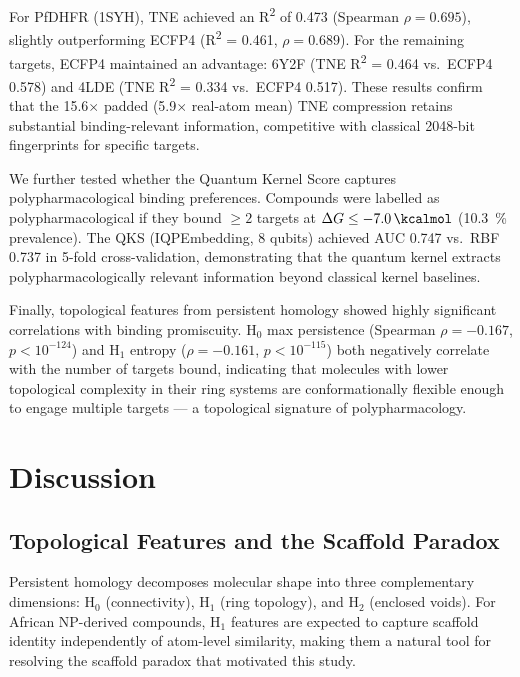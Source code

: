 \documentclass[11pt,a4paper]{article}
\begin{document}
For PfDHFR (1SYH), TNE achieved an R\textsuperscript{2} of \num{0.473} (Spearman $\rho = \num{0.695}$), slightly outperforming ECFP4 (R\textsuperscript{2} = \num{0.461}, $\rho = \num{0.689}$). For the remaining targets, ECFP4 maintained an advantage: 6Y2F (TNE R\textsuperscript{2} = \num{0.464} vs.\ ECFP4 \num{0.578}) and 4LDE (TNE R\textsuperscript{2} = \num{0.334} vs.\ ECFP4 \num{0.517}). These results confirm that the \num{15.6}$\times$ padded (\num{5.9}$\times$ real-atom mean) TNE compression retains substantial binding-relevant information, competitive with classical \num{2048}-bit fingerprints for specific targets.

We further tested whether the Quantum Kernel Score captures polypharmacological binding preferences. Compounds were labelled as polypharmacological if they bound $\geq 2$ targets at $\Delta G \leq -\SI{7.0}{\kcalmol}$ (\qty{10.3}{\percent} prevalence). The QKS (IQPEmbedding, 8 qubits) achieved AUC \num{0.747} vs.\ RBF \num{0.737} in \num{5}-fold cross-validation, demonstrating that the quantum kernel extracts polypharmacologically relevant information beyond classical kernel baselines.

Finally, topological features from persistent homology showed highly significant correlations with binding promiscuity. H$_0$ max persistence (Spearman $\rho = -\num{0.167}$, $p < 10^{-124}$) and H$_1$ entropy ($\rho = -\num{0.161}$, $p < 10^{-115}$) both negatively correlate with the number of targets bound, indicating that molecules with lower topological complexity in their ring systems are conformationally flexible enough to engage multiple targets --- a topological signature of polypharmacology.


\section{Discussion}

\subsection{Topological Features and the Scaffold Paradox}

Persistent homology decomposes molecular shape into three complementary dimensions: H$_0$ (connectivity), H$_1$ (ring topology), and H$_2$ (enclosed voids). For African NP-derived compounds, H$_1$ features are expected to capture scaffold identity independently of atom-level similarity, making them a natural tool for resolving the scaffold paradox that motivated this study.
\end{document}
